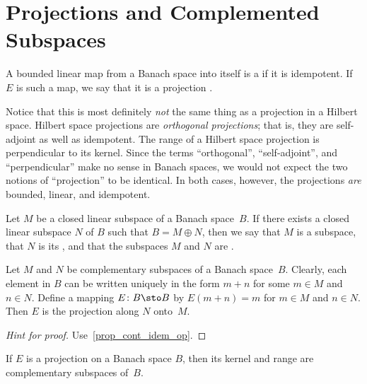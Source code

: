 \section{Projections and Complemented Subspaces}
\begin{defn}
 A bounded linear map from a Banach space into itself is a
 if it is idempotent.  If $E$ is such a map, we say that it is a
projection .
\end{defn}

Notice that this is most definitely \emph{not} the same thing as a projection in a
Hilbert space.  Hilbert space projections are \emph{orthogonal projections}; that is,
they are self-adjoint as well as idempotent.  The range of a Hilbert space projection
is perpendicular to its kernel.  Since the terms ``orthogonal'', ``self-adjoint'', and
``perpendicular'' make no sense in Banach spaces, we would not expect the two notions
of ``projection'' to be identical.  In both cases, however, the projections \emph{are}
bounded, linear, and idempotent.

\begin{defn}  Let $M$ be a closed linear subspace of a Banach space~$B$.  If there exists a
closed linear subspace $N$ of $B$ such that $B = M \oplus N$, then we say that $M$ is a
 subspace, that $N$ is its
, and that the subspaces $M$ and $N$ are
.
\end{defn}

\begin{prop}\label{C069814} Let $M$ and $N$ be complementary subspaces of a Banach space~$B$. Clearly, each
element in $B$ can be written uniquely in the form $m + n$ for some $m \in M$ and $n \in
N$. Define a mapping $E \colon B \sto B$ by $E(m + n) = m$ for $m \in M$ and $n \in N$.
Then $E$ is the projection along $N$ onto~$M$.
\end{prop}

\begin{proof}[\emph{Hint for proof}] Use~\ref{prop_cont_idem_op}.  \ns
\end{proof}

\begin{prop}\label{C069817} If $E$ is a projection on a Banach space $B$, then its kernel and range are
complementary subspaces of~$B$.
\end{prop}

